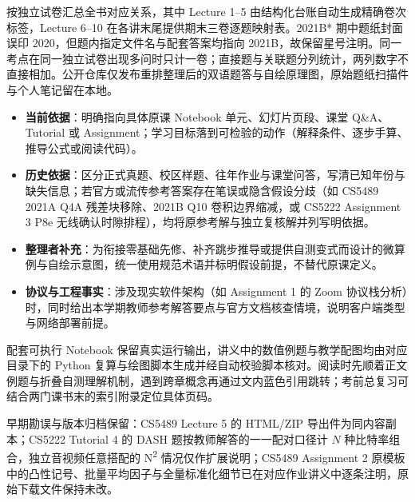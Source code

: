 按独立试卷汇总全书对应关系，其中 Lecture 1–5 由结构化台账自动生成精确卷次标签，Lecture 6–10 在各讲末尾提供期末三卷逐题映射表。2021B* 期中题纸封面误印 2020，但题内指定文件名与配套答案均指向 2021B，故保留星号注明。同一考点在同一独立试卷出现多问时只计一卷；直接题与关联题分列统计，两列数字不直接相加。公开仓库仅发布重排整理后的双语题答与自绘原理图，原始题纸扫描件与个人笔记留在本地。





\begin{itemize}

\item \textbf{当前依据}：明确指向具体原课 Notebook 单元、幻灯片页段、课堂 Q\&A、Tutorial 或 Assignment；学习目标落到可检验的动作（解释条件、逐步手算、推导公式或阅读代码）。

\item \textbf{历史依据}：区分正式真题、校区样题、往年作业与课堂问答，写清已知年份与缺失信息；若官方或流传参考答案存在笔误或隐含假设分歧（如 CS5489 2021A Q4A 残差块移除、2021B Q10 卷积边界缩减，或 CS5222 Assignment 3 P8e 无线确认时隙排程），均将原参考解与独立复核解并列写明依据。

\item \textbf{整理者补充}：为衔接零基础先修、补齐跳步推导或提供自测变式而设计的微算例与自绘示意图，统一使用规范术语并标明假设前提，不替代原课定义。

\item \textbf{协议与工程事实}：涉及现实软件架构（如 Assignment 1 的 Zoom 协议栈分析）时，同时给出本学期教师参考解答要点与官方文档核查情境，说明客户端类型与网络部署前提。

\end{itemize}





配套可执行 Notebook 保留真实运行输出，讲义中的数值例题与教学配图均由对应目录下的 Python 复算与绘图脚本生成并经自动校验脚本核对。阅读时先顺着正文例题与折叠自测理解机制，遇到跨章概念再通过文内蓝色引用跳转；考前总复习可结合两门课书末的索引附录定位具体页码。

早期勘误与版本归档保留：CS5489 Lecture 5 的 HTML/ZIP 导出件为同内容副本；CS5222 Tutorial 4 的 DASH 题按教师解答的一一配对口径计 \(N\) 种比特率组合，独立音视频任意搭配的 N\textsuperscript{2} 情况仅作扩展说明；CS5489 Assignment 2 原模板中的凸性记号、批量平均因子与全量标准化细节已在对应作业讲义中逐条注明，原始下载文件保持未改。
